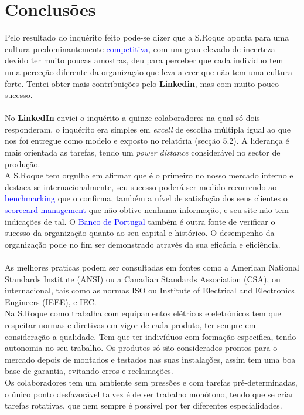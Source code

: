 \section{Conclusões}
\qquad Pelo resultado do inquérito feito pode-se dizer que a S.Roque aponta para uma cultura predominantemente \textcolor{blue}{competitiva}, com um grau elevado de incerteza devido ter muito poucas amostras, deu para perceber que cada individuo tem uma perceção diferente da organização que leva a crer que não tem uma cultura forte. Tentei obter mais contribuições pelo \textbf{Linkedin}, mas com muito pouco sucesso. \\
\\
No \textbf{LinkedIn} enviei o inquérito a quinze colaboradores na qual só dois responderam, o inquérito era simples em \textit{excell} de escolha múltipla igual ao que nos foi entregue como modelo e exposto no relatória (secção 5.2).
A liderança é mais orientada as tarefas, tendo um \textit{power distance} considerável no sector de produção.\\
A S.Roque tem orgulho em afirmar que é o primeiro no nosso mercado interno e destaca-se internacionalmente, seu sucesso poderá ser medido recorrendo ao \textcolor{blue}{benchmarking} que o confirma, também a nível de satisfação dos seus clientes o \textcolor{blue}{scorecard management} que não obtive nenhuma informação, e seu site não tem indicações de tal. O \textcolor{blue}{Banco de Portugal} também é outra fonte de verificar o sucesso da organização quanto ao seu capital e histórico. O desempenho da organização pode no fim ser demonstrado através da sua eficácia e eficiência.\\
\\
As melhores praticas podem ser consultadas em fontes como a American National Standards Institute (ANSI) ou a Canadian Standards Association (CSA), ou internacional, tais como as normas ISO ou Institute of Electrical and Electronics Engineers (IEEE), e IEC. \\
Na S.Roque como trabalha com equipamentos elétricos e eletrónicos tem que respeitar normas e diretivas em vigor de cada produto, ter sempre em consideração a qualidade. Tem que ter indivíduos com formação especifica, tendo autonomia no seu trabalho. Os produtos só são considerados prontos para o mercado depois de montados e testados nas suas instalações, assim tem uma boa base de garantia, evitando erros e reclamações.\\
Os colaboradores tem um ambiente sem pressões e com tarefas pré-determinadas, o único ponto desfavorável talvez é de ser trabalho monótono, tendo que se criar tarefas rotativas, que nem sempre é possível por ter diferentes especialidades.\\
